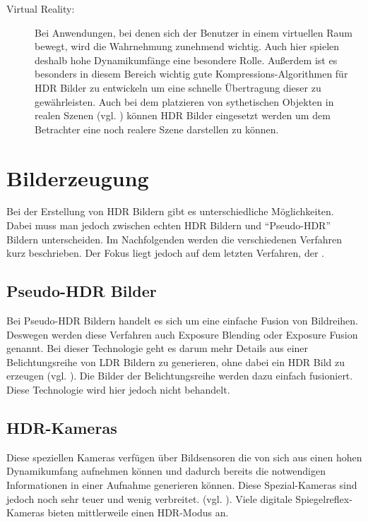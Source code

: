 \begin{description}
\item[Virtual Reality:] Bei Anwendungen, bei denen sich der Benutzer in einem virtuellen Raum bewegt, wird die Wahrnehmung zunehmend wichtig. Auch hier spielen deshalb hohe Dynamikumfänge eine besondere Rolle. Außerdem ist es besonders in diesem Bereich wichtig gute Kompressions-Algorithmen für \gls{HDR} Bilder zu entwickeln um eine schnelle Übertragung dieser zu gewährleisten. Auch bei dem platzieren von sythetischen Objekten in realen Szenen (vgl. \cite{Debevec:2008:RSO:1401132.1401175}) können \gls{HDR} Bilder eingesetzt werden um dem Betrachter eine noch realere Szene darstellen zu können.
\end{description}

\section{Bilderzeugung}
Bei der Erstellung von \gls{HDR} Bildern gibt es unterschiedliche Möglichkeiten. Dabei muss man jedoch zwischen echten \gls{HDR} Bildern und \enquote{Pseudo-\gls{HDR}} Bildern unterscheiden. Im Nachfolgenden werden die verschiedenen Verfahren kurz beschrieben. Der Fokus liegt jedoch auf dem letzten Verfahren, der .


\subsection{Pseudo-HDR Bilder}
Bei Pseudo-\gls{HDR} Bildern handelt es sich um eine einfache Fusion von Bildreihen. Deswegen werden diese Verfahren auch Exposure Blending oder Exposure Fusion genannt. Bei dieser Technologie geht es darum mehr Details aus einer Belichtungsreihe von \gls{LDR} Bildern zu generieren, ohne dabei ein \gls{HDR} Bild zu erzeugen (vgl. \cite{Jing_Hong_Zheng_Rahardja_2012}). Die Bilder der Belichtungsreihe werden dazu einfach fusioniert. Diese Technologie wird hier jedoch nicht behandelt.

\subsection{HDR-Kameras} 
Diese speziellen Kameras verfügen über Bildsensoren die von sich aus einen hohen Dynamikumfang aufnehmen können und dadurch bereits die notwendigen Informationen in einer Aufnahme generieren können. Diese Spezial-Kameras sind jedoch noch sehr teuer und wenig verbreitet. (vgl. \cite[S. 95ff]{Bloch2012}). Viele digitale Spiegelreflex-Kameras bieten mittlerweile einen \gls{HDR}-Modus an.

